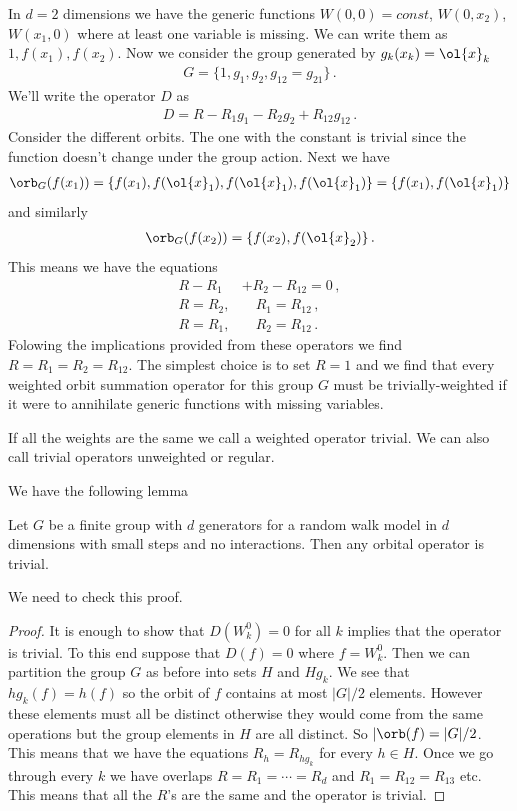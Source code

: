 \begin{example} In $d = 2$ dimensions we have the generic functions $W(0,0) = const$, $W(0,x_2)$, $W(x_1,0)$ where at least one variable is missing. We can write them as $1, f(x_1), f(x_2)$. Now we consider the group generated by $g_k(x_k) = \ol{x}_k$
\begin{align}
	G = \{1, g_1, g_2, g_{12} = g_{21}\}\,.
\end{align}
We'll write the operator $D$ as 
\begin{align}
	D = R - R_1 g_1 - R_2 g_2 + R_{12} g_{12}\,.
\end{align}
Consider the different orbits. The one with the constant is trivial since the function doesn't change under the group action. Next we have
\begin{align}
	\orb_G(f(x_1)) = \{f(x_1),f(\ol{x}_1),f(\ol{x}_1), f(\ol{x}_1)\} = \{f(x_1),f(\ol{x}_1)\}
\end{align}
and similarly
\begin{align}
	\orb_G(f(x_2)) = \{f(x_2),f(\ol{x}_2)\}\,.
\end{align}
This means we have the equations
\begin{align}
	R - R_1 &+ R_2 - R_{12} = 0\,,\\
	R = R_2, &\quad R_1 = R_{12}\,,\\
	R = R_1, &\quad R_2 = R_{12}\,.
\end{align}
Folowing the implications provided from these operators we find $R= R_1 = R_2 = R_{12}$. The simplest choice is to set $R = 1$ and we find that every weighted orbit summation operator for this group $G$ must be trivially-weighted if it were to annihilate generic functions with missing variables.
\end{example}
\begin{definition} If all the weights are the same we call a weighted operator trivial. We can also call trivial operators unweighted or regular.
\end{definition}
We have the following lemma
\begin{lemma} Let $G$ be a finite group with $d$ generators for a random walk model in $d$ dimensions with small steps and no interactions. Then any orbital operator is trivial.
\end{lemma}
We need to check this proof.
\begin{proof}It is enough to show that $D(W_k^0) = 0$ for all $k$ implies that the operator is trivial. To this end suppose that $D(f) = 0$ where $f = W_k^0$. Then we can partition the group $G$ as before into sets $H$ and $Hg_k$. We see that $hg_k (f) = h(f)$ so the orbit of $f$ contains at most $|G|/2$ elements. However these elements must all be distinct otherwise they would come from the same operations but the group elements in $H$ are all distinct. So $|\orb(f) = |G|/2$. This means that we have the equations $R_h = R_{hg_k}$ for every $h \in H$. Once we go through every $k$ we have overlaps $R = R_1 =\cdots = R_d$ and $R_1 = R_{12} = R_{13}$ etc. This means that all the $R$'s are the same and the operator is trivial.
\end{proof}
